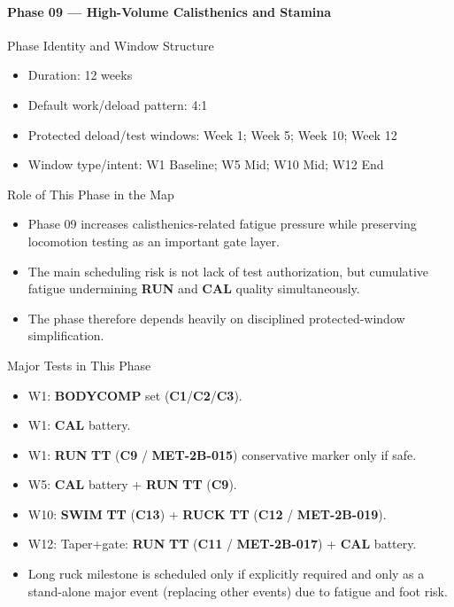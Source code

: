 \documentclass[10pt]{article}
\begin{document}
\newpage
\paragraph*{Phase 09 — High-Volume Calisthenics and Stamina}

Phase Identity and Window Structure

\begin{itemize}
\item Duration: 12 weeks
\item Default work/deload pattern: 4:1
\item Protected deload/test windows: Week 1; Week 5; Week 10; Week 12
\item Window type/intent: W1 Baseline; W5 Mid; W10 Mid; W12 End
\end{itemize}

Role of This Phase in the Map

\begin{itemize}
\item Phase 09 increases calisthenics-related fatigue pressure while preserving locomotion testing as an important gate layer.
\item The main scheduling risk is not lack of test authorization, but cumulative fatigue undermining \textbf{RUN} and \textbf{CAL} quality simultaneously.
\item The phase therefore depends heavily on disciplined protected-window simplification.
\end{itemize}

Major Tests in This Phase

\begin{itemize}
\item W1: \textbf{BODYCOMP} set (\textbf{C1}/\textbf{C2}/\textbf{C3}).
\item W1: \textbf{CAL} battery.
\item W1: \textbf{RUN} \textbf{TT} (\textbf{C9} / \textbf{MET-2B-015}) conservative marker only if safe.
\item W5: \textbf{CAL} battery + \textbf{RUN} \textbf{TT} (\textbf{C9}).
\item W10: \textbf{SWIM} \textbf{TT} (\textbf{C13}) + \textbf{RUCK} \textbf{TT} (\textbf{C12} / \textbf{MET-2B-019}).
\item W12: Taper+gate: \textbf{RUN} \textbf{TT} (\textbf{C11} / \textbf{MET-2B-017}) + \textbf{CAL} battery.
\item Long ruck milestone is scheduled only if explicitly required and only as a stand-alone major event (replacing other events) due to fatigue and foot risk.
\end{itemize}
\end{document}
